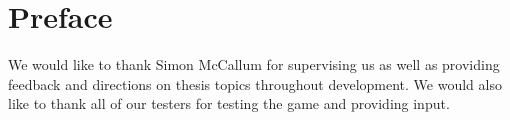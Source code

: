 \chapter*{Preface} %
\label{chap:preface}
We would like to thank Simon McCallum for supervising us as well as providing feedback and directions on thesis topics throughout development. We would also like to thank all of our testers for testing the game and providing input.
 
